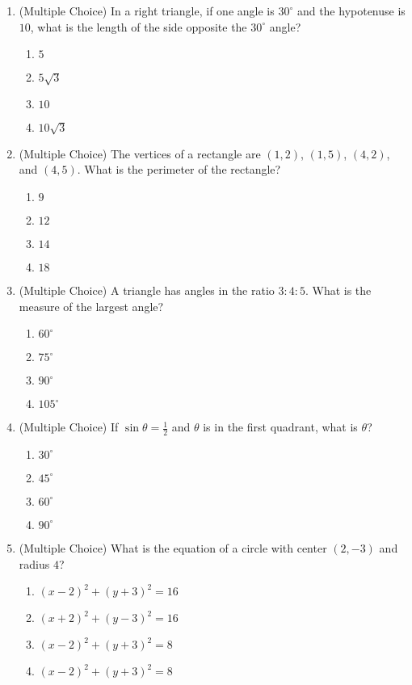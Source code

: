 \documentclass[12pt]{article}
\begin{document}
\begin{enumerate}[label=\textbf{Question \arabic*:}]
  \item (Multiple Choice) In a right triangle, if one angle is \(30^\circ\) and the hypotenuse is \(10\), what is the length of the side opposite the \(30^\circ\) angle?
    \begin{enumerate}[label=(\Alph*)]
      \item \(5\)
      \item \(5\sqrt{3}\)
      \item \(10\)
      \item \(10\sqrt{3}\)
    \end{enumerate}
    
  \item (Multiple Choice) The vertices of a rectangle are \((1,2)\), \((1,5)\), \((4,2)\), and \((4,5)\). What is the perimeter of the rectangle?
    \begin{enumerate}[label=(\Alph*)]
      \item \(9\)
      \item \(12\)
      \item \(14\)
      \item \(18\)
    \end{enumerate}
    
  \item (Multiple Choice) A triangle has angles in the ratio \(3:4:5\). What is the measure of the largest angle?
    \begin{enumerate}[label=(\Alph*)]
      \item \(60^\circ\)
      \item \(75^\circ\)
      \item \(90^\circ\)
      \item \(105^\circ\)
    \end{enumerate}
    
  \item (Multiple Choice) If \(\sin \theta = \frac{1}{2}\) and \(\theta\) is in the first quadrant, what is \(\theta\)?
    \begin{enumerate}[label=(\Alph*)]
      \item \(30^\circ\)
      \item \(45^\circ\)
      \item \(60^\circ\)
      \item \(90^\circ\)
    \end{enumerate}
    
  \item (Multiple Choice) What is the equation of a circle with center \((2, -3)\) and radius \(4\)?
    \begin{enumerate}[label=(\Alph*)]
      \item \((x-2)^2+(y+3)^2=16\)
      \item \((x+2)^2+(y-3)^2=16\)
      \item \((x-2)^2+(y+3)^2=8\)
      \item \((x-2)^2+(y+3)^2=8\)
    \end{enumerate}
    

\end{enumerate}
\end{document}
